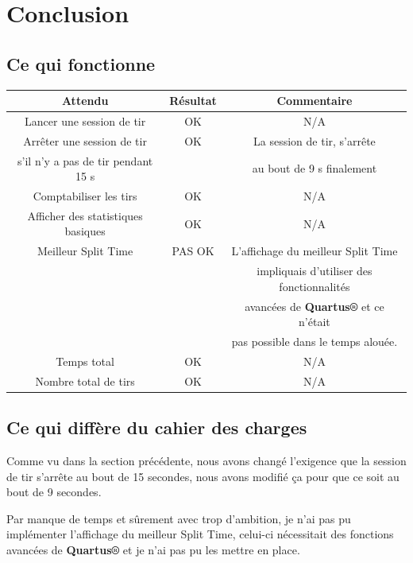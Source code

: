 \documentclass{rapport}
\begin{document}
\section{Conclusion}
\subsection{Ce qui fonctionne}

\begin{center}
    \begin{tabular}{ |c|c|c| } 
        \hline
            \textbf{Attendu} & \textbf{Résultat} & \textbf{Commentaire} \\
        \hline
            Lancer une session de tir & OK & N/A \\
        \hline
            Arrêter une session de tir & OK & La session de tir, s’arrête  \\
            s'il n'y a pas de tir pendant 15 s & & au bout de 9 s finalement \\
        \hline
            Comptabiliser les tirs & OK & N/A \\
        \hline
            Afficher des statistiques basiques & OK & N/A \\
        \hline
            Meilleur Split Time & PAS OK & L'affichage du meilleur Split Time \\
            & & impliquais d'utiliser des fonctionnalités \\
            & & avancées de \textbf{Quartus®} et ce n'était \\
            & & pas possible dans le temps alouée. \\
        \hline
            Temps total & OK & N/A \\
        \hline
            Nombre total de tirs & OK & N/A \\
        \hline
    \end{tabular}
\end{center}

\subsection{Ce qui diffère du cahier des charges}

Comme vu dans la section précédente, nous avons changé l’exigence que la session de tir s’arrête au bout de 15 secondes, nous avons modifié ça pour que ce soit au bout de 9 secondes.

Par manque de temps et sûrement avec trop d'ambition, je n'ai pas pu implémenter l'affichage du meilleur Split Time, celui-ci nécessitait des fonctions avancées de \textbf{Quartus®} et je n'ai pas pu les mettre en place.
\end{document}
